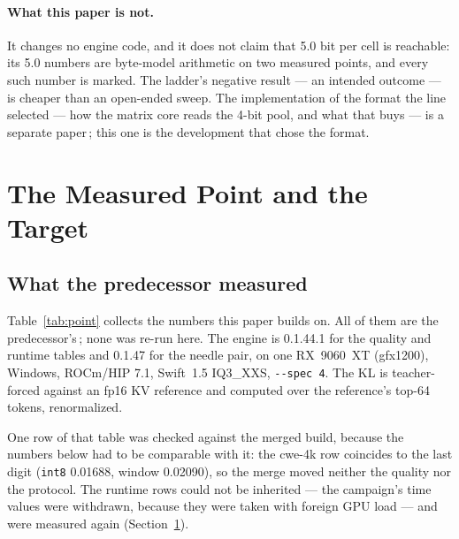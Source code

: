 \documentclass[10pt,twocolumn]{article}
\begin{document}
\paragraph{What this paper is not.} It changes no engine code, and it does not claim that 5.0 bit per cell is
reachable: its 5.0 numbers are byte-model arithmetic on two measured points, and every such number is
marked. The ladder's negative result --- an intended outcome --- is cheaper than an open-ended sweep. The
implementation of the format the line selected --- how the matrix core reads the 4-bit pool, and what that
buys --- is a separate paper\,\cite{q4u32paper}; this one is the development that chose the format.

\section{The Measured Point and the Target}\label{sec:target}

\subsection{What the predecessor measured}

Table~\ref{tab:point} collects the numbers this paper builds on. All of them are the predecessor's\,\cite{kvwin,strata-details}; none was re-run here. The engine is 0.1.44.1 for the quality and runtime tables and 0.1.47 for the needle pair, on one RX~9060~XT (gfx1200), Windows, ROCm/HIP 7.1, Swift~1.5 IQ3\_XXS, \texttt{-{}-spec 4}. The KL is teacher-forced against an fp16 KV reference and computed over the reference's top-64 tokens, renormalized.

One row of that table was checked against the merged build, because the numbers below had to be comparable with it: the cwe-4k row coincides to the last digit (\texttt{int8} 0.01688, window 0.02090), so the merge moved neither the quality nor the protocol. The runtime rows could not be inherited --- the campaign's time values were withdrawn, because they were taken with foreign GPU load --- and were measured again (Section~\ref{sec:target}).
\end{document}
